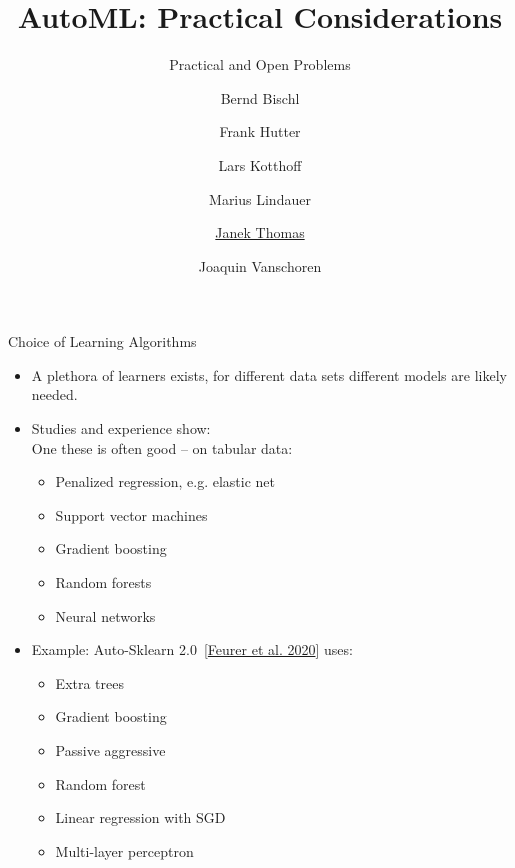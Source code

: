 

\usepackage[normalem]{ulem}
\usepackage{pifont}
\usepackage{relsize}
\renewcommand{\lit}[1]{{\smaller\color{black!60}[#1]}}
\title[AutoML: Practical]{AutoML: Practical Considerations} 
\subtitle{Practical and Open Problems}
\author[Janek Thomas]{Bernd Bischl \and Frank Hutter \and Lars Kotthoff\newline \and Marius Lindauer \and \underline{Janek Thomas} \and Joaquin Vanschoren}



	
	\maketitle

	\begin{frame}{Choice of Learning Algorithms}
		\begin{itemize}
		  \item A plethora of learners exists, for different data sets different models are likely needed.
	  
			  
		  \item Studies and experience show:\\
	  
			  One these is often good -- on tabular data:
		  \begin{itemize}
			\item Penalized regression, e.g. elastic net
			\item Support vector machines
			\item Gradient boosting
			\item Random forests
			\item Neural networks
		\end{itemize}
			\item Example: Auto-Sklearn 2.0~\lit{{\href{https://arxiv.org/pdf/2007.04074.pdf}{Feurer et al. 2020}}} uses: 
	  
		  \begin{itemize}
			  \item Extra trees 
			  \item Gradient boosting 
			  \item Passive aggressive 
			  \item Random forest 
			  \item Linear regression with SGD
			  \item Multi-layer perceptron
		\end{itemize}
		  \end{itemize}
	  \end{frame}
	  
